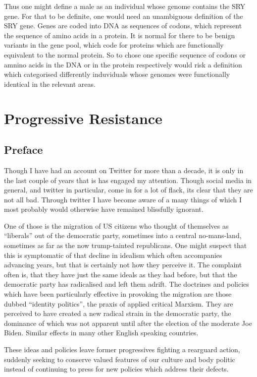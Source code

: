 \documentclass[10pt,titlepage]{book}
\begin{document}
Thus one might define a male as an individual whose genome contains the SRY gene.
For that to be definite, one would need an unambiguous definition of the SRY gene.
Genes are coded into DNA as sequences of codons, which represent the sequence of amino acids in a protein.
It is normal for there to be benign variants in the gene pool, which code for proteins which are functionally equivalent to the normal protein.
So to chose one specific sequence of codons or amnino acids in the DNA or in the protein respectively would risk a definition which categorised differently induviduals whose genomes were functionally identical in the relevant areas.

\chapter{Progressive Resistance}

\section{Preface}

Though I have had an account on Twitter for more than a decade, it is only in the last couple of years that is has engaged my attention.
Though social media in general, and twitter in particular, come in for a lot of flack, its clear that they are not all bad.
Through twitter I have become aware of a many things of which I most probably would otherwise have remained blissfully ignorant.

One of those is the migration of US citizens who thought of themselves as ``liberals'' out of the democratic party, sometimes into a central no-mans-land, sometimes as far as the now trump-tainted republicans.
One might suspect that this is symptomatic of that decline in idealism which often accompanies advancing years, but that is certainly not how they perceive it.
The complaint often is, that they have just the same ideals as they had before, but that the democratic party has radicalised and left them adrift.
The doctrines and policies which have been particularly effective in provoking the migration are those dubbed ``identity politics'', the praxis of applied critical Marxism.
They are perceived to have created a new radical strain in the democratic party, the dominance of which was not apparent until after the election of the moderate Joe Biden.
Similar effects in many other English speaking countries.

These ideas and policies leave former progressives fighting a rearguard action, suddenly seeking to conserve valued features of our culture and body politic instead of continuing to press for new policies which address their defects.
\end{document}
